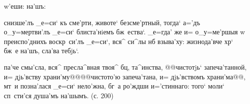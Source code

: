   w'еши:    на'шъ:


 снизше'лъ _е=си` къ сме'рти, животе` 
безсме'ртный, тогда` а='дъ о_у=мертви'лъ _е=си` 
блиста'нiемъ бж~ества`. _е=гда' же и= о_у=ме'ршыя w\т 
преиспо'днихъ воскр~си'лъ _е=си`, вся^ си^лы нб 
взыва'ху: жизнода'вче хр` бж~е на'шъ, сла'ва тебjь`.

  па'че смы'сла, вся^ 
пресла^вная твоя^ бц, та^инства, @@чистотjь` 
запеча'танной, и= дjь'вству храни'му@@{@@чистото'ю 
запеча'тана, и= дjь'вствомъ храни'ма@@}, мт~и позна'лася 
_е=си` нело'жна, бг~а ро'ждши и='стиннаго: того` моли` 
сп~сти'ся душа'мъ на'шымъ. (с. 200)
